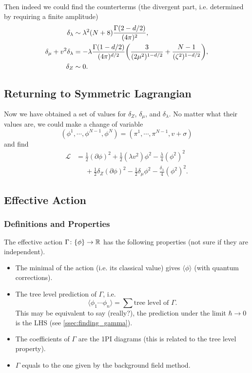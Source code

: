 \documentclass{article}
\begin{document}
\par
Then indeed we could find the counterterms (the divergent part, i.e. determined by requiring a finite amplitude)
\begin{align*}
    \delta_\lambda &\sim \lambda^2 (N+8) \frac{\Gamma(2-d/2)}{(4\pi)^2}, \\
    \delta_\mu + v^2 \delta_\lambda &= -\lambda \frac{\Gamma(1-d/2)}{(4\pi)^{d/2}} \qty(\frac{3}{(2\mu^2)^{1-d/2}} + \frac{N-1}{(\zeta^2)^{1-d/2}}), \\
    \delta_Z &\sim 0.
\end{align*}

\subsection{Returning to Symmetric Lagrangian}

Now we have obtained a set of values for $\delta_Z$, $\delta_\mu$, and $\delta_\lambda$.
No matter what their values are, we could make a change of variable
\[ (\phi^1,\cdots,\phi^{N-1},\phi^N) = (\pi^1,\cdots,\pi^{N-1}, v+\sigma) \]
and find
\begin{align*}
    \mathcal{L} &= \frac{1}{2}(\partial \phi)^2 + \frac{1}{2}(\lambda v^2) \phi^2 - \frac{\lambda}{4}(\phi^2)^2 \\
    &\phantom{{}={}} + \frac{1}{2}\delta_Z (\partial\phi)^2 - \frac{1}{2}\delta_\mu \phi^2 - \frac{\delta_\lambda}{4}(\phi^2)^2.
\end{align*}

\subsection{Effective Action}

\subsubsection{Definitions and Properties}

The effective action $\Gamma\colon \qty{\phi} \to \mathbb{R}$ has the following properties (not sure if they are independent).
\begin{itemize}
    \item The minimal of the action (i.e. its classical value) gives $\langle \phi \rangle$ (with quantum corrections).
    \item The tree level prediction of $\Gamma$, i.e.
    \[ \langle \phi_1 \cdots \phi_n \rangle = \sum \text{tree level of }\Gamma. \]
    This may be equivalent to say (really?), the prediction under the limit $\hbar \rightarrow 0$ is the LHS (see \cref{ssec:finding_gamma}).
    \item The coefficients of $\Gamma$ are the 1PI diagrams (this is related to the tree level property).
    \item $\Gamma$ equals to the one given by the background field method.
\end{itemize}
\end{document}
